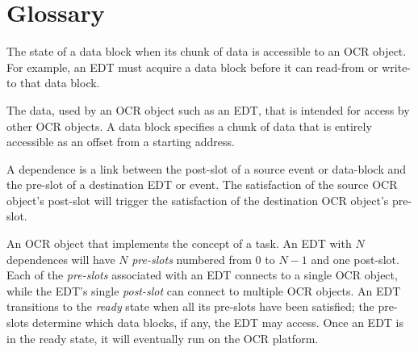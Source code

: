 %
%

%
\section{Glossary}
\label{sec:Glossary}
\glossarydefstart
The state of a data block when its chunk of data is accessible to an
OCR object. For example, an EDT must acquire a data block before it
can read-from or write-to that data block.
\glossarydefend

\glossarydefstart
The data, used by an OCR object such as an EDT, that is intended for
access by other OCR objects. A data block specifies
a chunk of data that is entirely accessible as an offset from a starting address.
\glossarydefend

\glossarydefstart
A dependence is a link between the post-slot of a source event or
data-block and the pre-slot of a destination EDT or event. The
satisfaction of the source OCR object's post-slot will trigger the
satisfaction of the destination OCR object's pre-slot.
\glossarydefend

\glossarydefstart
An OCR object that implements the concept of a task. An EDT with $N$
dependences will have $N$ \emph{pre-slots} numbered from $0$ to $N-1$
and one post-slot.
Each of the \emph{pre-slots} associated with an EDT connects to a
single OCR object, while the EDT’s single \emph{post-slot} can connect
to multiple OCR objects. An EDT transitions to the \emph{ready} state when all its
pre-slots have been satisfied; the pre-slots determine which
data blocks, if any, the EDT may access.  Once an EDT is in the ready state, it will 
eventually run on the OCR platform.
\glossarydefend

